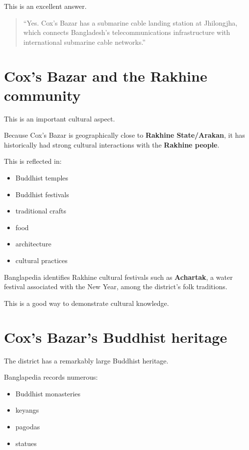 This is an excellent answer.

\begin{quote}
``Yes. Cox's Bazar has a submarine cable landing station at Jhilongjha, which connects Bangladesh's telecommunications infrastructure with international submarine cable networks.''\\
\end{quote}

\medskip

\section{Cox's Bazar and the Rakhine community}

This is an important cultural aspect.

Because Cox's Bazar is geographically close to \textbf{Rakhine State/Arakan}, it has historically had strong cultural interactions with the \textbf{Rakhine people}.

This is reflected in:

\begin{itemize}
  \item Buddhist temples
  \item Buddhist festivals
  \item traditional crafts
  \item food
  \item architecture
  \item cultural practices
\end{itemize}

Banglapedia identifies Rakhine cultural festivals such as \textbf{Achartak}, a water festival associated with the New Year, among the district's folk traditions.

This is a good way to demonstrate cultural knowledge.

\medskip

\section{Cox's Bazar's Buddhist heritage}

The district has a remarkably large Buddhist heritage.

Banglapedia records numerous:

\begin{itemize}
  \item Buddhist monasteries
  \item keyangs
  \item pagodas
  \item statues
\end{itemize}

